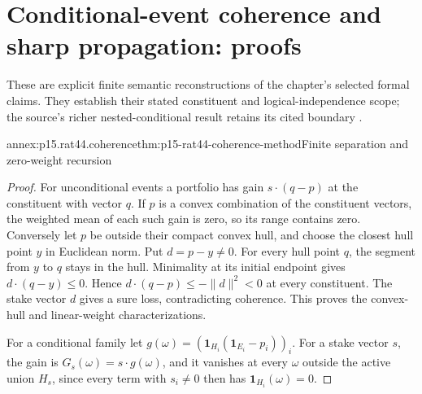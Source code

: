 \section{Conditional-event coherence and sharp propagation: proofs}
\label{sec:annex-p15-rationality-4-4}

These are explicit finite semantic reconstructions of the chapter's
selected formal claims. They establish their stated constituent and
logical-independence scope; the source's richer nested-conditional result
retains its cited boundary \cite{Pfeifer2021ProbabilityLogic}.

\begin{annexitem}{annex:p15.rat44.coherence}{thm:p15-rat44-coherence-method}{Finite separation and zero-weight recursion}
\begin{proof}
For unconditional events a portfolio has gain \(s\cdot(q-p)\) at
the constituent with vector \(q\). If \(p\) is a convex combination
of the constituent vectors, the weighted mean of each such gain is
zero, so its range contains zero. Conversely let \(p\) be outside
their compact convex hull, and choose the closest hull point \(y\)
in Euclidean norm. Put \(d=p-y\ne0\). For every hull point \(q\),
the segment from \(y\) to \(q\) stays in the hull. Minimality at
its initial endpoint gives \(d\cdot(q-y)\leq0\). Hence
\(d\cdot(q-p)\leq-\|d\|^2<0\) at every constituent. The stake
vector \(d\) gives a sure loss, contradicting coherence.
This proves the convex-hull and linear-weight characterizations.

For a conditional family let
\(g(\omega)=(\mathbf1_{H_i}(\mathbf1_{E_i}-p_i))_i\).
For a stake vector \(s\), the gain is
\(G_s(\omega)=s\cdot g(\omega)\), and it vanishes at every
\(\omega\) outside the active union \(H_s\), since every term
with \(s_i\ne0\) then has \(\mathbf1_{H_i}(\omega)=0\).


\end{proof}
\end{annexitem}

